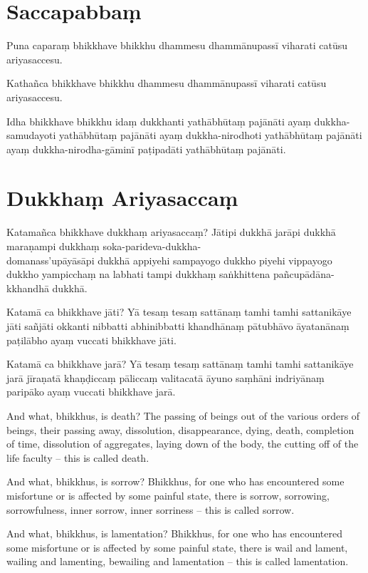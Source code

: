 \section*{Saccapabbaṃ}

Puna caparaṃ bhikkhave bhikkhu dhammesu dhammānupassī viharati catūsu
ariyasaccesu.

Kathañca bhikkhave bhikkhu dhammesu dhammānupassī viharati catūsu ariyasaccesu.

Idha bhikkhave bhikkhu idaṃ dukkhanti yathābhūtaṃ pajānāti ayaṃ dukkha-samudayoti
yathābhūtaṃ pajānāti ayaṃ dukkha-nirodhoti yathābhūtaṃ pajānāti ayaṃ
dukkha-nirodha-gāminī paṭipadāti yathābhūtaṃ pajānāti.

\section*{Dukkhaṃ Ariyasaccaṃ}

Katamañca bhikkhave dukkhaṃ ariyasaccaṃ? Jātipi dukkhā jarāpi dukkhā maraṇampi
dukkhaṃ soka-parideva-dukkha-\\
domanass'upāyāsāpi dukkhā appiyehi sampayogo dukkho
piyehi vippayogo dukkho yampicchaṃ na labhati tampi dukkhaṃ saṅkhittena
pañcupādāna-kkhandhā dukkhā.

Katamā ca bhikkhave jāti? Yā tesaṃ tesaṃ sattānaṃ tamhi tamhi sattanikāye jāti
sañjāti okkanti nibbatti abhinibbatti khandhānaṃ pātubhāvo āyatanānaṃ paṭilābho
ayaṃ vuccati bhikkhave jāti.

Katamā ca bhikkhave jarā? Yā tesaṃ tesaṃ sattānaṃ tamhi tamhi sattanikāye jarā
jīraṇatā khaṇḍiccaṃ pāliccaṃ valitacatā āyuno saṃhāni indriyānaṃ paripāko ayaṃ
vuccati bhikkhave jarā.

\englishPage

And what, bhikkhus, is death? The passing of beings out of the various orders of
beings, their passing away, dissolution, disappearance, dying, death, completion
of time, dissolution of aggregates, laying down of the body, the cutting off of
the life faculty -- this is called death.

And what, bhikkhus, is sorrow? Bhikkhus, for one who has encountered some
misfortune or is affected by some painful state, there is sorrow, sorrowing,
sorrowfulness, inner sorrow, inner sorriness -- this is called sorrow.

And what, bhikkhus, is lamentation? Bhikkhus, for one who has encountered some
misfortune or is affected by some painful state, there is wail and lament,
wailing and lamenting, bewailing and lamentation -- this is called lamentation.

